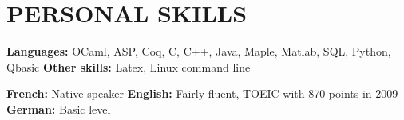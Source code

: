 \documentclass[11pt,a4paper,sans]{moderncv} %
\renewcommand{\emph}{\textbf}
\newcommand{\labb}[2]{\emph{#1:} #2}
\begin{document}
\section{PERSONAL SKILLS}

{\labb{Languages}{OCaml, ASP, Coq, C, C++, Java, Maple, Matlab, SQL, Python, Qbasic}\newline{}
\labb{Other skills}{Latex, Linux command line}}

{\labb{French}{Native speaker}\newline{}
\labb{English}{Fairly fluent, TOEIC with 870 points in 2009}\newline{}
\labb{German}{Basic level}}
\end{document}
